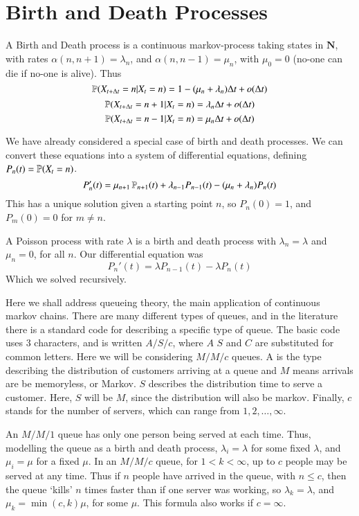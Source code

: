 \section{Birth and Death Processes}

\begin{definition}
    A Birth and Death process is a continuous markov-process taking states in $\mathbf{N}$, with rates $\alpha(n,n+1) = \lambda_n$, and $\alpha(n,n-1) = \mu_n$, with $\mu_0 = 0$ (no-one can die if no-one is alive). Thus
    \[ \operatorname{\mathbb{P}}(X_{t + \Delta t} = n | X_t = n) = 1 - (\mu_n + \lambda_n) \Delta t + o(\Delta t) \]
    \[ \operatorname{\mathbb{P}}(X_{t + \Delta t} = n + 1 | X_t = n) = \lambda_n \Delta t + o(\Delta t) \]
    \[ \operatorname{\mathbb{P}}(X_{t + \Delta t} = n - 1 | X_t = n) = \mu_n \Delta t + o(\Delta t) \]
\end{definition}

We have already considered a special case of birth and death processes. We can convert these equations into a system of differential equations, defining $P_n(t) = \operatorname{\mathbb{P}}(X_t = n)$.
%
\[ P_n'(t) = \mu_{n+1} \operatorname{\mathbb{P}}_{n+1}(t) + \lambda_{n-1} P_{n-1}(t) - (\mu_n + \lambda_n) P_n(t) \]
%
This has a unique solution given a starting point $n$, so $P_n(0) = 1$, and $P_m(0) = 0$ for $m \neq n$.

\begin{example}
    A Poisson process with rate $\lambda$ is a birth and death process with $\lambda_n = \lambda$ and $\mu_n = 0$, for all $n$. Our differential equation was
    \[ P_n'(t) = \lambda P_{n-1}(t) - \lambda P_n(t)  \]
    Which we solved recursively.
\end{example}

Here we shall address queueing theory, the main application of continuous markov chains. There are many different types of queues, and in the literature there is a standard code for describing a specific type of queue. The basic code uses 3 characters, and is written $A/S/c$, where $A$ $S$ and $C$ are substituted for common letters. Here we will be considering $M/M/c$ queues. A is the type describing the distribution of customers arriving at a queue and $M$ means arrivals are be memoryless, or Markov. $S$ describes the distribution time to serve a customer. Here, $S$ will be $M$, since the distribution will also be markov. Finally, $c$ stands for the number of servers, which can range from $1,2, \dots, \infty$.

An $M/M/1$ queue has only one person being served at each time. Thus, modelling the queue as a birth and death process, $\lambda_i = \lambda$ for some fixed $\lambda$, and $\mu_i = \mu$ for a fixed $\mu$. In an $M/M/c$ queue, for $1 < k < \infty$, up to $c$ people may be served at any time. Thus if $n$ people have arrived in the queue, with $n \leq c$, then the queue `kills' $n$ times faster than if one server was working, so $\lambda_k = \lambda$, and $\mu_k = \min(c,k) \mu$, for some $\mu$. This formula also works if $c = \infty$.

